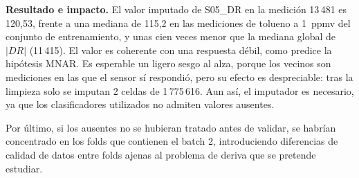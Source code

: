 \textbf{Resultado e impacto.} El valor imputado de S05\_DR en la medición 13\,481 es 120,53,
frente a una mediana de 115,2 en las mediciones de tolueno a 1~ppmv del conjunto de
entrenamiento, y unas cien veces menor que la mediana global de $|DR|$ (11\,415). El valor es
coherente con una respuesta débil, como predice la hipótesis MNAR. Es esperable un ligero sesgo
al alza, porque los vecinos son mediciones en las que el sensor sí respondió, pero su efecto es
despreciable: tras la limpieza solo se imputan 2 celdas de 1\,775\,616. Aun así, el imputador es
necesario, ya que los clasificadores utilizados no admiten valores ausentes.

Por último, si los ausentes no se hubieran tratado antes de validar, se habrían concentrado en
los folds que contienen el batch 2, introduciendo diferencias de calidad de datos entre folds
ajenas al problema de deriva que se pretende estudiar.